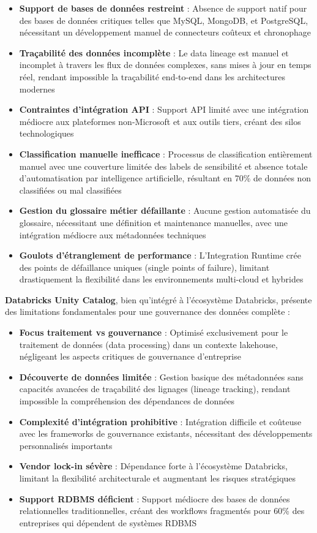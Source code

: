 \begin{itemize}
    \item \textbf{Support de bases de données restreint} : Absence de support natif pour des bases de données critiques telles que MySQL, MongoDB, et PostgreSQL, nécessitant un développement manuel de connecteurs coûteux et chronophage
    \item \textbf{Traçabilité des données incomplète} : Le data lineage est manuel et incomplet à travers les flux de données complexes, sans mises à jour en temps réel, rendant impossible la traçabilité end-to-end dans les architectures modernes
    \item \textbf{Contraintes d'intégration API} : Support API limité avec une intégration médiocre aux plateformes non-Microsoft et aux outils tiers, créant des silos technologiques
    \item \textbf{Classification manuelle inefficace} : Processus de classification entièrement manuel avec une couverture limitée des labels de sensibilité et absence totale d'automatisation par intelligence artificielle, résultant en 70\% de données non classifiées ou mal classifiées
    \item \textbf{Gestion du glossaire métier défaillante} : Aucune gestion automatisée du glossaire, nécessitant une définition et maintenance manuelles, avec une intégration médiocre aux métadonnées techniques
    \item \textbf{Goulots d'étranglement de performance} : L'Integration Runtime crée des points de défaillance uniques (single points of failure), limitant drastiquement la flexibilité dans les environnements multi-cloud et hybrides
\end{itemize}

\textbf{Databricks Unity Catalog}, bien qu'intégré à l'écosystème Databricks, présente des limitations fondamentales pour une gouvernance des données complète :

\begin{itemize}
    \item \textbf{Focus traitement vs gouvernance} : Optimisé exclusivement pour le traitement de données (data processing) dans un contexte lakehouse, négligeant les aspects critiques de gouvernance d'entreprise
    \item \textbf{Découverte de données limitée} : Gestion basique des métadonnées sans capacités avancées de traçabilité des lignages (lineage tracking), rendant impossible la compréhension des dépendances de données
    \item \textbf{Complexité d'intégration prohibitive} : Intégration difficile et coûteuse avec les frameworks de gouvernance existants, nécessitant des développements personnalisés importants
    \item \textbf{Vendor lock-in sévère} : Dépendance forte à l'écosystème Databricks, limitant la flexibilité architecturale et augmentant les risques stratégiques
    \item \textbf{Support RDBMS déficient} : Support médiocre des bases de données relationnelles traditionnelles, créant des workflows fragmentés pour 60\% des entreprises qui dépendent de systèmes RDBMS
\end{itemize}


